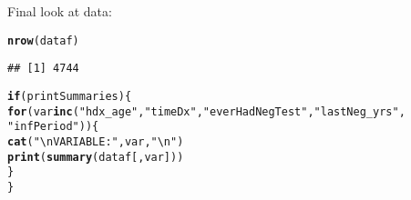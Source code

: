 \documentclass{article}\usepackage[]{graphicx}\usepackage[]{color}
\makeatletter
\newcommand{\hlstr}[1]{\textcolor[rgb]{0.192,0.494,0.8}{#1}}%
\newcommand{\hlstd}[1]{\textcolor[rgb]{0.345,0.345,0.345}{#1}}%
\newcommand{\hlkwa}[1]{\textcolor[rgb]{0.161,0.373,0.58}{\textbf{#1}}}%
\newcommand{\hlkwd}[1]{\textcolor[rgb]{0.737,0.353,0.396}{\textbf{#1}}}%
\newenvironment{kframe}{%
 \def\at@end@of@kframe{}%
 \ifinner\ifhmode%
  \def\at@end@of@kframe{\end{minipage}}%
  \begin{minipage}{\columnwidth}%
 \fi\fi%
 \def\FrameCommand##1{\hskip\@totalleftmargin \hskip-\fboxsep
 \colorbox{shadecolor}{##1}\hskip-\fboxsep
     \hskip-\linewidth \hskip-\@totalleftmargin \hskip\columnwidth}%
 \MakeFramed {\advance\hsize-\width
   \@totalleftmargin\z@ \linewidth\hsize
   \@setminipage}}%
 {\par\unskip\endMakeFramed%
 \at@end@of@kframe}
\newenvironment{knitrout}{}{} %
\makeatother
\begin{document}
Final look at data:
\begin{knitrout}
\color{fgcolor}\begin{kframe}
\begin{alltt}
\hlkwd{nrow}\hlstd{(dataf)}
\end{alltt}
\begin{verbatim}
## [1] 4744
\end{verbatim}
\begin{alltt}
\hlkwa{if} \hlstd{(printSummaries) \{}
    \hlkwa{for} \hlstd{(var} \hlkwa{in} \hlkwd{c}\hlstd{(}\hlstr{"hdx_age"}\hlstd{,} \hlstr{"timeDx"}\hlstd{,} \hlstr{"everHadNegTest"}\hlstd{,} \hlstr{"lastNeg_yrs"}\hlstd{,}
        \hlstr{"infPeriod"}\hlstd{)) \{}
        \hlkwd{cat}\hlstd{(}\hlstr{"\textbackslash{}nVARIABLE:"}\hlstd{, var,} \hlstr{"\textbackslash{}n"}\hlstd{)}
        \hlkwd{print}\hlstd{(}\hlkwd{summary}\hlstd{(dataf[, var]))}
    \hlstd{\}}
\hlstd{\}}
\end{alltt}
\end{kframe}
\end{knitrout}
\end{document}
